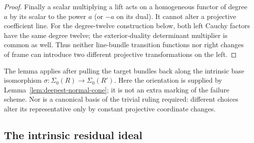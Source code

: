 \begin{proof}
Finally a scalar multiplying a lift acts on a homogeneous functor
of degree \(a\) by its scalar to the power \(a\) (or \(-a\)
on its dual).  It cannot alter a projective coefficient line.
For the degree-twelve construction below, both left Cauchy factors
have the same degree twelve; the exterior-duality determinant
multiplier is common as well.  Thus neither line-bundle transition
functions nor right changes of frame can introduce two different
projective transformations on the left.
\end{proof}

The lemma applies after pulling the target bundles back along the
intrinsic base isomorphism \(\sigma:\Sigma_0(R)\to\Sigma_0(R')\).
Here the orientation is supplied by
Lemma~\ref{lem:deepest-normal-cone}; it is not an extra marking of
the failure scheme.  Nor is a canonical basis of the trivial ruling
required: different choices alter its representative only by constant
projective coordinate changes.

\subsection{The intrinsic residual ideal}


